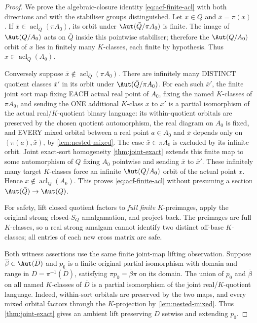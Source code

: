 \begin{proof}
We prove the algebraic-closure identity
\eqref{eq:acf-finite-acl} with both directions
and with the stabiliser groups distinguished.
Let \(x\in Q\) and \(\bar x=\pi(x)\).
If \(\bar x\in\operatorname{acl}_{\bar Q}(\pi A_0)\),
its orbit under \(\Aut(\bar Q/\pi A_0)\)
is finite. The image of \(\Aut(Q/A_0)\)
acts on \(\bar Q\) inside this pointwise
stabiliser; therefore the \(\Aut(Q/A_0)\)
orbit of \(x\) lies in finitely many
\(K\)-classes, each finite by hypothesis.
Thus \(x\in\operatorname{acl}_Q(A_0)\).

Conversely suppose
\(\bar x\notin\operatorname{acl}_{\bar Q}(\pi A_0)\).
There are infinitely many DISTINCT
quotient classes \(\bar x'\) in its orbit
under \(\Aut(\bar Q/\pi A_0)\).
For each such \(\bar x'\), the finite
joint sort map fixing EACH actual
real point of \(A_0\), fixing the
named \(K\)-classes of \(\pi A_0\),
and sending the ONE additional
\(K\)-class \(\bar x\) to \(\bar x'\)
is a partial isomorphism of the
actual real/\(K\)-quotient binary
language: its within-quotient
orbitals are preserved by the chosen
quotient automorphism, the real
diagram on \(A_0\) is fixed, and
EVERY mixed orbital between a real
point \(a\in A_0\) and \(\bar x\)
depends only on
\((\pi(a),\bar x)\), by
\cref{lem:nested-mixed}.
The case \(\bar x\in\pi A_0\)
is excluded by its infinite orbit.
Joint exact-sort homogeneity
\cref{thm:joint-exact} extends this
finite map to some automorphism of
\(Q\) fixing \(A_0\) pointwise and
sending \(\bar x\) to \(\bar x'\).
These infinitely many target
\(K\)-classes force an infinite
\(\Aut(Q/A_0)\) orbit of the
actual point \(x\). Hence
\(x\notin\operatorname{acl}_Q(A_0)\).
This proves \eqref{eq:acf-finite-acl}
without presuming a section
\(\Aut(\bar Q)\to\Aut(Q)\).

For safety, lift closed quotient factors to
\emph{full finite} \(K\)-preimages, apply the
original strong closed-\(S_Q\) amalgamation, and
project back.  The preimages are full
\(K\)-classes, so a real strong amalgam cannot
identify two distinct off-base \(K\)-classes;
all entries of each new cross matrix are safe.

Both witness assertions use the same finite joint-map lifting
observation. Suppose \(\overline\beta\in\Aut(\overline D)\)
and \(p_0\) is a finite original partial isomorphism with domain
and range in \(D=\pi^{-1}(\overline D)\), satisfying
\(\pi p_0=\overline\beta\pi\) on its domain. The union of
\(p_0\) and \(\overline\beta\) on all named \(K\)-classes
of \(\overline D\) is a partial isomorphism of the joint
real/\(K\)-quotient language. Indeed, within-sort orbitals are
preserved by the two maps, and every mixed orbital factors
through the \(K\)-projection by \cref{lem:nested-mixed}.
Thus \cref{thm:joint-exact} gives an ambient lift preserving
\(D\) setwise and extending \(p_0\).


\end{proof}
